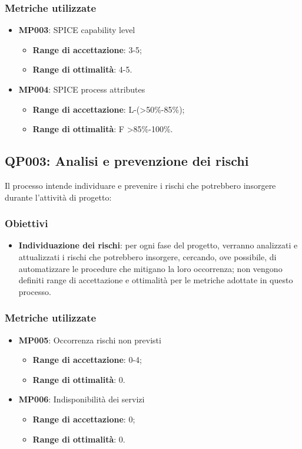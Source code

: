 \subsubsection{Metriche utilizzate}
\begin{itemize}
	\item \textbf{MP003}: SPICE capability level
	\begin{itemize}
		\item \textbf{Range di accettazione}: 3-5;
		\item \textbf{Range di ottimalità}: 4-5.
	\end{itemize}
	\item \textbf{MP004}: SPICE process attributes
	\begin{itemize}
		\item \textbf{Range di accettazione}: L-(>50\%-85\%);
		\item \textbf{Range di ottimalità}: F >85\%-100\%.
	\end{itemize}
\end{itemize}

\subsection{QP003: Analisi e prevenzione dei rischi}\label{pro3}
Il processo intende individuare e prevenire i rischi che potrebbero insorgere durante l'attività di progetto:

\subsubsection{Obiettivi}
\begin{itemize}
	\item \textbf{Individuazione dei rischi}: per ogni fase del progetto, verranno analizzati e attualizzati i rischi che potrebbero insorgere, cercando, ove possibile, di automatizzare le procedure che mitigano la loro occorrenza; non vengono definiti range di accettazione e ottimalità per le metriche adottate in questo processo.
\end{itemize}

\subsubsection{Metriche utilizzate}
\begin{itemize}	
	\item \textbf{MP005}: Occorrenza rischi non previsti
	\begin{itemize}
		\item \textbf{Range di accettazione}: 0-4;
		\item \textbf{Range di ottimalità}: 0.
	\end{itemize}
	\item \textbf{MP006}: Indisponibilità dei servizi
	\begin{itemize}
		\item \textbf{Range di accettazione}: 0;
		\item \textbf{Range di ottimalità}: 0.
	\end{itemize}
\end{itemize}
